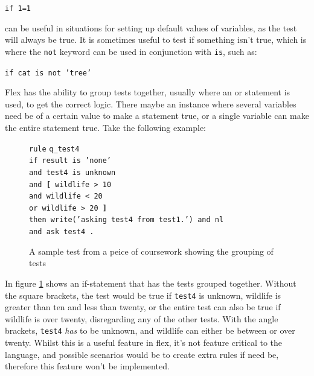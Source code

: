 \documentclass[12pt]{report}
\begin{document}
\begin{center}
\texttt{if 1=1}
\end{center}
can be useful in situations for setting up default values of variables, as the test will always be true.  It is sometimes useful to test if something isn't true, which is where the \texttt{not} keyword can be used in conjunction with \texttt{is}, such as:\\
\begin{center}
\texttt{if cat is not 'tree'}\\
\end{center}
Flex has the ability to group tests together, usually where an or statement is used, to get the correct logic.  There maybe an instance where several variables need be of a certain value to make a statement true, or a single variable can make the entire statement true.  Take the following example:
\begin{figure}[H]
	\begin{tabbing}
		\texttt{rule} \= \texttt{q\_test4}\\
		\> \texttt{if result is 'none'}\\
		\> \texttt{and test4 is unknown}\\
		\> \texttt{and \textbf{[} wildlife > 10}\\
		\> \texttt{and wildlife < 20}\\
		\> \texttt{or wildlife > 20 \textbf{]}}\\
		\> \texttt{then write('asking test4 from test1.') and nl}\\
		\> \texttt{and ask test4 .}\\
	\end{tabbing}
	\caption{A sample test from a peice of coursework showing the grouping of tests}\label{fig:if_grouping}
\end{figure}
In figure \ref{fig:if_grouping} shows an if-statement that has the tests grouped together.  Without the square brackets, the test would be true if \texttt{test4} is unknown, wildlife is greater than ten and less than twenty, or the entire test can also be true if wildlife is over twenty, disregarding any of the other tests.  With the angle brackets, \texttt{test4} \textit{has} to be unknown, and wildlife can either be between or over twenty.  Whilst this is a useful feature in flex, it's not feature critical to the language, and possible scenarios would be to create extra rules if need be, therefore this feature won't be implemented.
\end{document}
